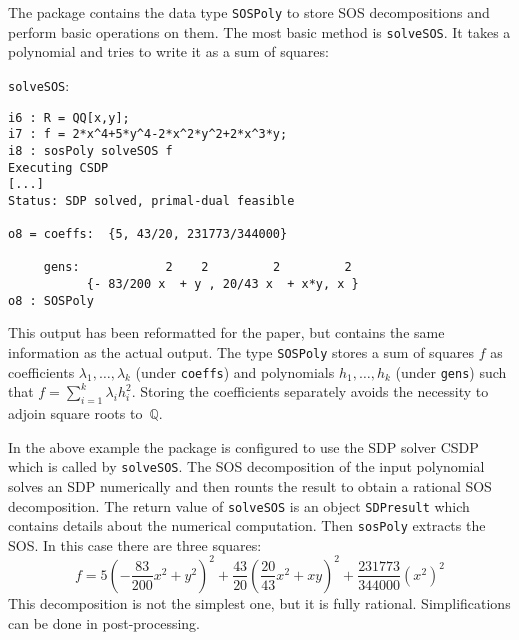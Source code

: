 \documentclass[11pt]{amsart}
\theoremstyle{plain}%
\theoremstyle{definition}
\theoremstyle{remark}
\newcommand{\QQ}{\mathbb{Q}}
\begin{document}
The package contains the data type \verb|SOSPoly| to store SOS decompositions and perform basic operations on them.
The most basic method is \verb|solveSOS|.
It takes a polynomial and tries to write it as a sum of squares:
{\small
\verb|solveSOS|:
\begin{verbatim}
i6 : R = QQ[x,y];
i7 : f = 2*x^4+5*y^4-2*x^2*y^2+2*x^3*y;
i8 : sosPoly solveSOS f
Executing CSDP
[...]
Status: SDP solved, primal-dual feasible

o8 = coeffs:  {5, 43/20, 231773/344000}              

     gens:            2    2         2         2    
           {- 83/200 x  + y , 20/43 x  + x*y, x }
o8 : SOSPoly
\end{verbatim}
}
This output has been reformatted for the paper, but contains the same information as the actual output.
The type \verb|SOSPoly| stores a sum of squares $f$ as coefficients $\lambda_{1},\dots,\lambda_{k}$ (under \verb|coeffs|) and polynomials $h_{1},\dots,h_{k}$ (under \verb|gens|) such that $f = \sum_{i=1}^{k}\lambda_{i}h_{i}^{2}$.
Storing the coefficients separately avoids the necessity to adjoin square roots to~$\QQ$.

In the above example the package is configured to use the SDP solver CSDP which is called by \verb|solveSOS|.
The SOS decomposition of the input polynomial solves an SDP numerically and then rounts the result to obtain a rational SOS decomposition.
The return value of \verb|solveSOS| is an object \verb|SDPresult| which contains details about the numerical computation.
Then \verb|sosPoly| extracts the SOS.
In this case there are three squares:
\[
  f = 5(-\frac{83}{200} x^{2}+y^{2})^{2} + \frac{43}{20}
  (\frac{20}{43}x^{2} + xy)^{2} + \frac{231773}{344000} (x^{2})^{2}
\]
This decomposition is not the simplest one, but it is fully rational. 
Simplifications can be done in post-processing.
\end{document}
